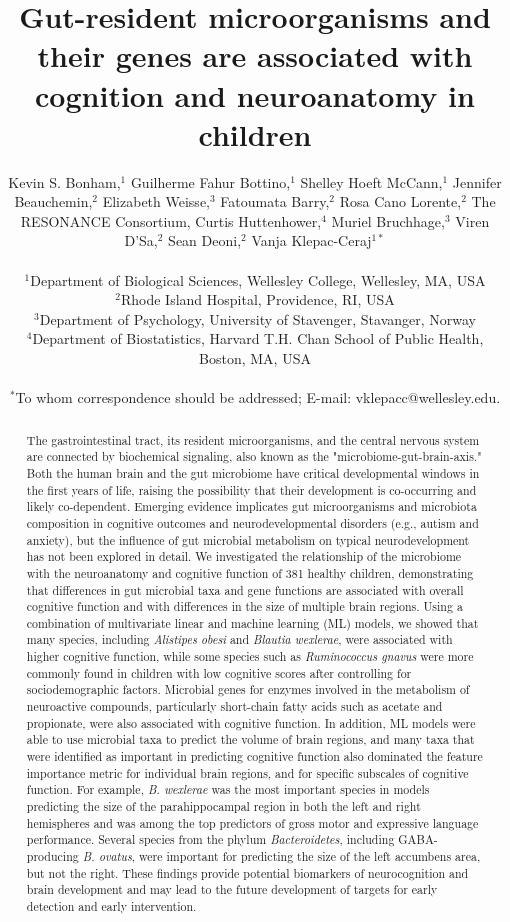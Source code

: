 \documentclass{article}
\title{Gut-resident microorganisms and their genes are associated with cognition and neuroanatomy in children}
\author{%
    \parbox{\linewidth}{\centering
        Kevin S. Bonham,$^{1}$
        Guilherme Fahur Bottino,$^{1}$
        Shelley Hoeft McCann,$^{1}$
        Jennifer Beauchemin,$^{2}$
        Elizabeth Weisse,$^{3}$
        Fatoumata Barry,$^{2}$
        Rosa Cano Lorente,$^{2}$
        The RESONANCE Consortium,
        Curtis Huttenhower,$^{4}$
        Muriel Bruchhage,$^{3}$
        Viren D'Sa,$^{2}$
        Sean Deoni,$^{2}$
        Vanja Klepac-Ceraj$^{1\ast}$
    }
\\
\normalsize{$^{1}$Department of Biological Sciences, Wellesley College, Wellesley, MA, USA}\\
\normalsize{$^{2}$Rhode Island Hospital, Providence, RI, USA}\\
\normalsize{$^{3}$Department of Psychology, University of Stavenger, Stavanger, Norway}\\
\normalsize{$^{4}$Department of Biostatistics, Harvard T.H. Chan School of Public Health, Boston, MA, USA}\\
\\
\normalsize{$^\ast$To whom correspondence should be addressed; E-mail:  vklepacc@wellesley.edu.}
}
\date{}
\begin{document}
\baselineskip24pt

\maketitle 

\begin{abstract}
The gastrointestinal tract, its resident microorganisms, and the central
nervous system are connected by biochemical signaling, also known as the
"microbiome-gut-brain-axis." Both the human brain and the gut microbiome
have critical developmental windows in the first years of life,
raising the possibility that their development is co-occurring and
likely co-dependent. Emerging evidence implicates gut microorganisms and
microbiota composition in cognitive outcomes and neurodevelopmental
disorders (e.g., autism and anxiety), but the influence of gut microbial
metabolism on typical neurodevelopment has not been explored in detail.
We investigated the relationship of the microbiome with the neuroanatomy
and cognitive function of 381 healthy children, demonstrating that
differences in gut microbial taxa and gene functions are associated with
overall cognitive function and with differences in the size of
multiple brain regions.
Using a combination of multivariate linear and machine learning (ML) models,
we showed that many species,
including \emph{Alistipes obesi} and \emph{Blautia wexlerae}, were
associated with higher cognitive function, while some
species such as \emph{Ruminococcus gnavus} were more commonly found in
children with low cognitive scores after controlling for sociodemographic factors.
Microbial genes for enzymes involved in the metabolism of
neuroactive compounds, particularly short-chain fatty acids such as
acetate and propionate, were also associated with cognitive function.
In addition, ML models were able to use microbial taxa to predict the
volume of brain regions, and many taxa that were identified
as important in predicting cognitive function also dominated the
feature importance metric for individual brain regions,
and for specific subscales of cognitive function.
For example, \emph{B. wexlerae}
was the most important species in models predicting the size of the parahippocampal region
in both the left and right hemispheres
and was among the top predictors of gross motor and expressive language performance.
Several species from
the phylum \textit{Bacteroidetes}, including GABA-producing
\emph{B. ovatus}, were important for predicting
the size of the left accumbens area, but not the right. These
findings provide potential biomarkers of neurocognition and brain development
and may lead to the future development of targets for early detection and early
intervention.
\end{abstract}
\end{document}
